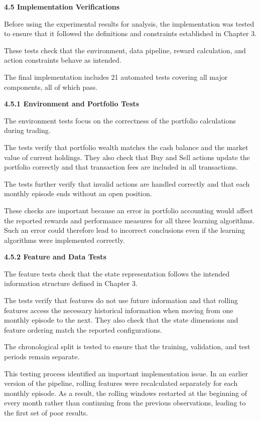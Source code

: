 \textbf{4.5 Implementation Verifications}

Before using the experimental results for analysis, the implementation
was tested to ensure that it followed the definitions and constraints
established in Chapter 3.

These tests check that the environment, data pipeline, reward
calculation, and action constraints behave as intended.

The final implementation includes 21 automated tests covering all major
components, all of which pass.

\textbf{4.5.1 Environment and Portfolio Tests}

The environment tests focus on the correctness of the portfolio
calculations during trading.

The tests verify that portfolio wealth matches the cash balance and the
market value of current holdings. They also check that Buy and Sell
actions update the portfolio correctly and that transaction fees are
included in all transactions.

The tests further verify that invalid actions are handled correctly and
that each monthly episode ends without an open position.

These checks are important because an error in portfolio accounting
would affect the reported rewards and performance measures for all three
learning algorithms. Such an error could therefore lead to incorrect
conclusions even if the learning algorithms were implemented correctly.

\textbf{4.5.2 Feature and Data Tests}

The feature tests check that the state representation follows the
intended information structure defined in Chapter 3.

The tests verify that features do not use future information and that
rolling features access the necessary historical information when moving
from one monthly episode to the next. They also check that the state
dimensions and feature ordering match the reported configurations.

The chronological split is tested to ensure that the training,
validation, and test periods remain separate.

This testing process identified an important implementation issue. In an
earlier version of the pipeline, rolling features were recalculated
separately for each monthly episode. As a result, the rolling windows
restarted at the beginning of every month rather than continuing from
the previous observations, leading to the first set of poor results.


